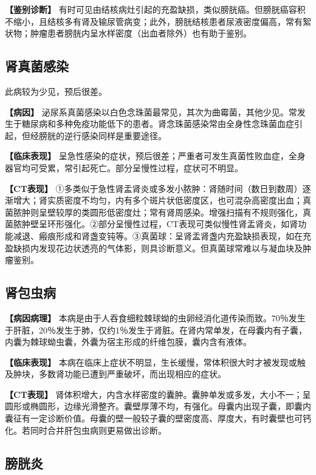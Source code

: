 \textbf{【鉴别诊断】}
有时可见由结核病灶引起的充盈缺损，类似膀胱癌。但膀胱癌容积不缩小，且结核多有肾及输尿管病变；此外，膀胱结核患者尿液密度偏高，常有絮状物；肿瘤患者膀胱内呈水样密度（出血者除外）也有助于鉴别。

\subsection{肾真菌感染}

此病较为少见，预后很差。

\textbf{【病因】}
泌尿系真菌感染以白色念珠菌最常见，其次为曲霉菌，其他少见。常发生于糖尿病和多种免疫功能低下的患者。肾念珠菌感染常由全身性念珠菌血症引起，但经膀胱的逆行感染同样是重要途径。

\textbf{【临床表现】}
呈急性感染的症状，预后很差；严重者可发生真菌性败血症，全身器官均可受累，常引起死亡。部分呈慢性过程，症状可不明显。

\textbf{【CT表现】}
①多类似于急性肾盂肾炎或多发小脓肿：肾随时间（数日到数周）逐渐增大；肾实质密度不均匀，内有多个斑片状低密度区，也可混杂高密度出血；真菌脓肿则呈壁较厚的类圆形低密度灶；常有肾周感染。增强扫描有不规则强化，真菌脓肿壁呈环形强化。②部分呈慢性过程，CT表现可类似慢性肾盂肾炎，如肾功能减退、瘢痕形成和肾盏变钝等。③真菌球：呈肾盂肾盏内充盈缺损表现，如在充盈缺损内发现花边状透亮的气体影，则具诊断意义。但真菌球常难以与凝血块及肿瘤鉴别。

\subsection{肾包虫病}

\textbf{【病因病理】}
本病是由于人吞食细粒棘球蚴的虫卵经消化道传染而致。70％发生于肝脏，20％发生于肺，仅约1％发生于肾脏。在肾内常单发，在母囊内有子囊，内囊为棘球蚴虫囊，外囊为宿主形成的纤维包膜，囊内含有液体。

\textbf{【临床表现】}
本病在临床上症状不明显，生长缓慢，常体积很大时才被发现或触及肿块，多数肾功能已遭到严重破坏，而出现相应的症状。

\textbf{【CT表现】}
肾体积增大，内含水样密度的囊肿。囊肿单发或多发，大小不一；呈圆形或椭圆形，边缘光滑整齐。囊壁厚薄不均，有强化。母囊内出现子囊，即囊内囊征有一定诊断价值。母囊的壁一般较子囊的壁密度高、厚度大，有时囊壁也可钙化。若同时合并肝包虫病则更易做出诊断。

\subsection{膀胱炎}

